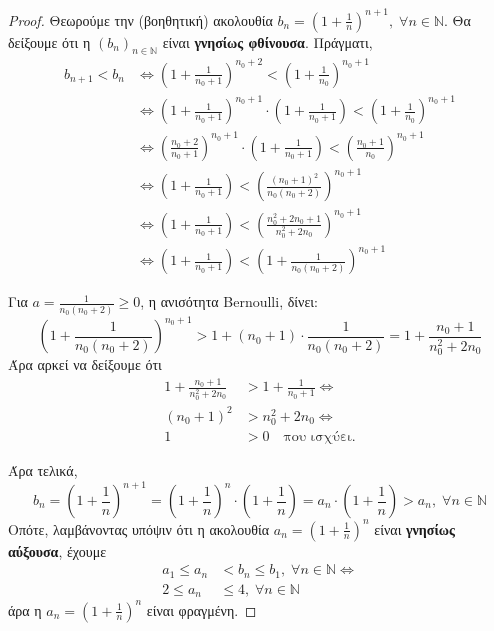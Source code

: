 \documentclass[main.tex]{subfiles}
\begin{document}
\begin{proof}
\item {}
  Θεωρούμε την (βοηθητική) ακολουθία $ b_{n} = \left(1+ \frac{1}{n} \right)^{n+1}, 
  \; \forall n \in \mathbb{N}$. Θα δείξουμε ότι η $ (b_{n})_{n \in \mathbb{N}} $ 
  είναι \textbf{γνησίως φθίνουσα}. Πράγματι, 
  \begin{align*}
    b_{n+1}< b_{n} 
        &\Leftrightarrow \left(1+ \frac{1}{n_{0}+1} \right)^{n_{0}+2} < \left(1 + 
        \frac{1}{n_{0}} \right)^{n_{0} +1} \\
        & \Leftrightarrow \left(1+ \frac{1}{n_{0}+1} \right)^{n_{0}+1} \cdot 
        \left(1 + \frac{1}{n_{0}+1}\right) < \left(1+ \frac{1}{n_{0}} \right)^{n_{0}+1}
        \\
        & \Leftrightarrow \left(\frac{n_{0}+2}{n_{0}+1} \right)^{n_{0}+1} 
        \cdot \left(1 + \frac{1}{n_{0}+1}\right) < \left(\frac{n_{0}+1}{n_{0}} 
        \right)^{n_{0}+1} \\
        & \Leftrightarrow \left(1 + \frac{1}{n_{0}+1} \right) < 
        \left(\frac{(n_{0}+1)^{2}}{n_{0}(n_{0} +2)} \right)^{n_{0}+1} \\
        & \Leftrightarrow \left(1 + \frac{1}{n_{0}+1} \right) < \left(\frac{n_{0}^{2}+
        2 n_{0}+1}{n_{0}^{2}+2 n_{0}} \right)^{n_{0}+1} \\
        & \Leftrightarrow \left(1 + \frac{1}{n_{0}+1} \right) < 
        \left(1+ \frac{1}{n_{0}(n_{0}+2)} \right)^{n_{0}+1}
  \end{align*} 

  Για $ a= \frac{1}{n_{0}(n_{0}+2)} \geq 0 $, η ανισότητα Bernoulli, δίνει:
  \[
    \left(1+ \frac{1}{n_{0}(n_{0}+2)} \right)^{n_{0}+1} > 1 + (n_{0}+1)\cdot 
    \frac{1}{n_{0}(n_{0}+2)} = 1 + \frac{n_{0}+1}{n_{0}^{2}+ 2 n_{0}} 
  \] 
  Άρα αρκεί να δείξουμε ότι 
  \begin{align*}
    1 + \frac{n_{0}+1}{n_{0}^{2}+ 2 n_{0}} &> 1 + \frac{1}{n_{0}+1} 
    \Leftrightarrow  \\
    (n_{0}+1)^{2} &> n_{0}^{2} + 2 n_{0} \Leftrightarrow \\
    1 &> 0 \quad \text{που ισχύει.}
  \end{align*}

  Άρα τελικά,
  \[
    b_{n} = \left(1+ \frac{1}{n} \right)^{n+1} = \left(1+ \frac{1}{n} \right)^{n} 
    \cdot \left(1 + \frac{1}{n} \right) = a_{n}\cdot \left(1+ \frac{1}{n} \right) 
    > a_{n}, \; \forall n \in \mathbb{N} 
  \]
  Οπότε, λαμβάνοντας υπόψιν ότι η ακολουθία 
  $ a_{n} = \left(1 + \frac{1}{n}\right)^{n} $ είναι \textbf{γνησίως αύξουσα}, έχουμε
  \begin{align*}
    a_{1} \leq a_{n} &< b_{n} \leq b_{1}, \; \forall n \in \mathbb{N} 
    \Leftrightarrow \\
    2 \leq a_{n} &\leq 4, \; \forall n \in \mathbb{N}
  \end{align*}
  άρα η $ a_{n} = \left(1 + \frac{1}{n} \right)^{n} $ είναι φραγμένη.
\end{proof}
\end{document}
